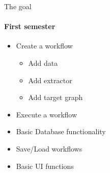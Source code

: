 \begin{frame}{The goal}
\framesubtitle{First semester}
	\begin{itemize}
		\item Create a workflow
		\begin{itemize}
			\item Add data
			\item Add extractor
			\item Add target graph
		\end{itemize}
		\item Execute a workflow
		\item Basic Database functionality
		\item Save/Load workflows
		\item Basic UI functions
	\end{itemize}
\end{frame}